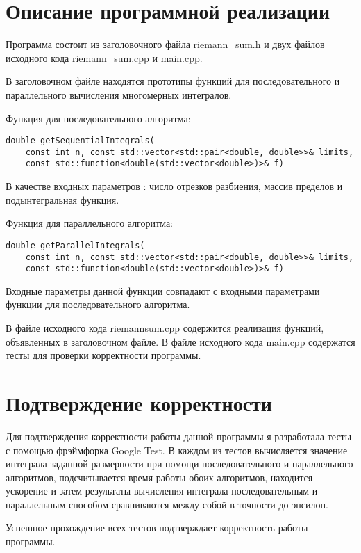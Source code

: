 \documentclass{report}
\begin{document}
\section*{Описание программной реализации}
Программа состоит из заголовочного файла riemann\_sum.h и двух файлов исходного кода riemann\_sum.cpp и main.cpp.
\par В заголовочном файле находятся прототипы функций для последовательного и параллельного вычисления многомерных интегралов.
\par Функция для последовательного алгоритма:
\begin{lstlisting}
double getSequentialIntegrals(
    const int n, const std::vector<std::pair<double, double>>& limits,
    const std::function<double(std::vector<double>)>& f) 
\end{lstlisting}
В качестве входных  параметров : число отрезков разбиения, массив пределов  и подынтегральная функция.
\par Функция для параллельного
алгоритма:
\begin{lstlisting}
double getParallelIntegrals(
    const int n, const std::vector<std::pair<double, double>>& limits,
    const std::function<double(std::vector<double>)>& f)
\end{lstlisting}
Входные параметры данной функции совпадают с входными параметрами функции для последовательного алгоритма.
\par В файле исходного кода  riemann\textunderscore sum.cpp содержится реализация функций, объявленных в заголовочном файле. В файле исходного кода main.cpp содержатся тесты для проверки корректности программы.
\newpage

\section*{Подтверждение корректности}
Для подтверждения корректности работы данной программы я разработала  тесты с помощью фрэймфорка Google Test. В каждом из тестов вычисляется значение интеграла заданной размерности при помощи последовательного и параллельного алгоритмов, подсчитывается время работы обоих алгоритмов, находится ускорение и затем результаты вычисления интеграла последовательным и параллельным способом сравниваются между собой в точности до эпсилон.

\par Успешное прохождение всех тестов подтверждает корректность работы программы.
\newpage
\end{document}
